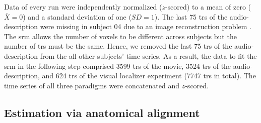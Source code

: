 

Data of every run were independently normalized ($z$-scored) to a mean of zero
($\overline{X}=0$) and a standard deviation of one ($SD=1$).
%
The last 75 \acp{tr} of the audio-description were missing in subject 04 due to
an image reconstruction problem \citep[s.][]{hanke2014audiomovie}.
%
The \ac{srm} allows the number of voxels to be different across subjects but the
number of \acp{tr} must be the same.
%
Hence, we removed the last 75 \acp{tr} of the audio-description from the all
other subjects' time series.
As a result, the data to fit the \ac{srm} in the following step comprised 3599
\acp{tr} of the movie, 3524 \acp{tr} of the audio-description, and 624 \acp{tr}
of the visual localizer experiment (7747 \acp{tr} in total).
The time series of all three paradigms were concatenated and $z$-scored.



\subsection{Estimation via anatomical alignment}



